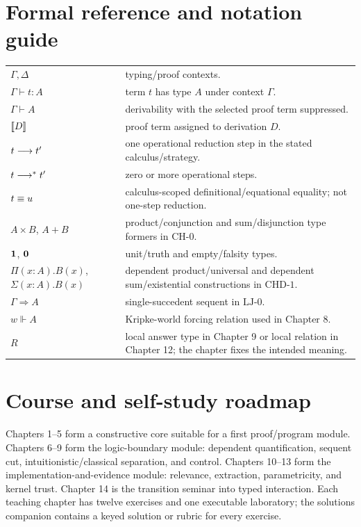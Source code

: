 \documentclass[11pt,openany]{book}
\begin{document}
\backmatter
\chapter*{Formal reference and notation guide}
\begin{longtable}{p{}p{}}
$\Gamma,\Delta$ & typing/proof contexts.\\
$\Gamma\vdash t:A$ & term $t$ has type $A$ under context $\Gamma$.\\
$\Gamma\vdash A$ & derivability with the selected proof term suppressed.\\
$\lbrack\!\lbrack D\rbrack\!\rbrack$ & proof term assigned to derivation $D$.\\
$t\mathrel{\longrightarrow} t'$ & one operational reduction step in the stated calculus/strategy.\\
$t\mathrel{\longrightarrow^{*}} t'$ & zero or more operational steps.\\
$t\mathrel{\equiv} u$ & calculus-scoped definitional/equational equality; not one-step reduction.\\
$A\times B$, $A+B$ & product/conjunction and sum/disjunction type formers in $\mathrm{CH}\text{-}0$.\\
$\mathbf{1}$, $\mathbf{0}$ & unit/truth and empty/falsity types.\\
$\Pi(x:A).B(x)$, $\Sigma(x:A).B(x)$ & dependent product/universal and dependent sum/existential constructions in $\mathrm{CHD}\text{-}1$.\\
$\Gamma\Rightarrow A$ & single-succedent sequent in $\mathrm{LJ}\text{-}0$.\\
$w\Vdash A$ & Kripke-world forcing relation used in Chapter 8.\\
$R$ & local answer type in Chapter 9 or local relation in Chapter 12; the chapter fixes the intended meaning.\\
\end{longtable}

\chapter*{Course and self-study roadmap}
Chapters 1--5 form a constructive core suitable for a first proof/program module. Chapters 6--9 form the logic-boundary module: dependent quantification, sequent cut, intuitionistic/classical separation, and control. Chapters 10--13 form the implementation-and-evidence module: relevance, extraction, parametricity, and kernel trust. Chapter 14 is the transition seminar into typed interaction. Each teaching chapter has twelve exercises and one executable laboratory; the solutions companion contains a keyed solution or rubric for every exercise.
\end{document}
